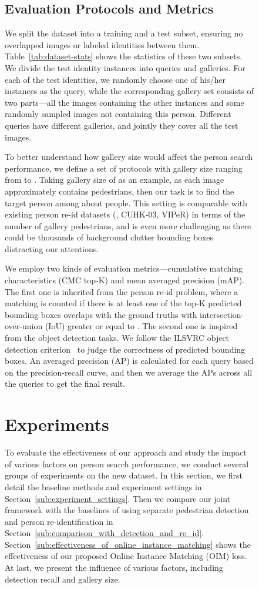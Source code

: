 \documentclass[10pt,twocolumn,letterpaper]{article}
\begin{document}
\begin{figure}[t]
\begin{center}
\subsection{Evaluation Protocols and Metrics} \label{sub:evaluation_protocols_and_metrics}
We split the dataset into a training and a test subset, ensuring no overlapped images or labeled identities between them. Table~\ref{tab:dataset-stats} shows the statistics of these two subsets. We divide the test identity instances into queries and galleries. For each of the  test identities, we randomly choose one of his/her instances as the query, while the corresponding gallery set consists of two parts---all the images containing the other instances and some randomly sampled images not containing this person. Different queries have different galleries, and jointly they cover all the  test images.

To better understand how gallery size would affect the person search performance, we define a set of protocols with gallery size ranging from  to . Taking gallery size of  as an example, as each image approximately contains  pedestrians, then our task is to find the target person among about  people. This setting is comparable with existing person re-id datasets (\eg, CUHK-03, VIPeR) in terms of the number of gallery pedestrians, and is even more challenging as there could be thousands of background clutter bounding boxes distracting our attentions.

We employ two kinds of evaluation metrics---cumulative matching characteristics (CMC top-K) and mean averaged precision (mAP). The first one is inherited from the person re-id problem, where a matching is counted if there is at least one of the top-K predicted bounding boxes overlaps with the ground truths with intersection-over-union (IoU) greater or equal to . The second one is inspired from the object detection tasks. We follow the ILSVRC object detection criterion~\cite{russakovsky2014imagenet} to judge the correctness of predicted bounding boxes. An averaged precision (AP) is calculated for each query based on the precision-recall curve, and then we average the APs across all the queries to get the final result.


\section{Experiments} \label{sec:experiments}
To evaluate the effectiveness of our approach and study the impact of various factors on person search performance, we conduct several groups of experiments on the new dataset. In this section, we first detail the baseline methods and experiment settings in Section~\ref{sub:experiment_settings}. Then we compare our joint framework with the baselines of using separate pedestrian detection and person re-identification in Section~\ref{sub:comparison_with_detection_and_re_id}. Section~\ref{sub:effectiveness_of_online_instance_matching} shows the effectiveness of our proposed Online Instance Matching (OIM) loss. At last, we present the influence of various factors, including detection recall and gallery size.


\end{center}
\end{figure}
\end{document}

